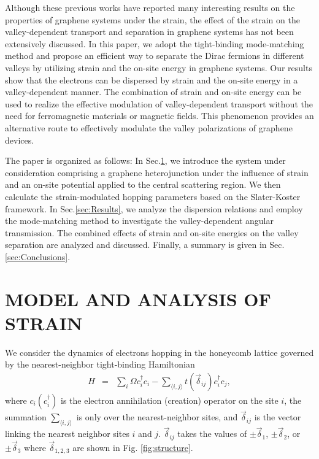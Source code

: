 \documentclass[reprint,amsmath,amssymb,aps,superscriptaddress]{revtex4-2}
\begin{document}
Although these previous works have reported many interesting results on the properties of graphene systems under the strain, the effect of the strain on the valley-dependent transport and separation in graphene systems has not been extensively discussed. In this paper, we adopt the tight-binding mode-matching method and propose an efficient way to separate the Dirac fermions in different valleys by utilizing strain and the on-site energy in graphene systems. Our results show that the electrons can be dispersed by strain and the on-site energy in a valley-dependent manner. The combination of strain and on-site energy can be used to realize the effective modulation of valley-dependent transport without the need for ferromagnetic materials or magnetic fields. This phenomenon provides an alternative route to effectively modulate the valley polarizations of graphene devices.

The paper is organized as follows: In Sec.\ref{sec:Model}, we introduce the system under consideration comprising a graphene heterojunction under the influence of strain and an on-site potential applied to the central scattering region. We then calculate the strain-modulated hopping parameters based on the Slater-Koster framework. In Sec.\ref{sec:Results}, we analyze the dispersion relations and employ the mode-matching method to investigate the valley-dependent angular transmission. The combined effects of strain and on-site energies on the valley separation are analyzed and discussed. Finally, a summary is given in Sec.\ref{sec:Conclusions}.

\section{MODEL AND ANALYSIS OF STRAIN}\label{sec:Model}
We consider the dynamics of electrons hopping in the honeycomb lattice governed by the nearest-neighbor tight-binding Hamiltonian~\cite{Song2012,Bahamon2011}
\begin{eqnarray}\label{eq:parameter}
	H&=&\sum_{i}\Omega c^\dag_{i} c_{i}- \sum_{\langle
		i,j\rangle} t(\vec{\delta}_{ij})c^\dag_{i}c_{j},
\end{eqnarray}
where $c_{i}(c^\dag_{i})$ is the electron annihilation (creation) operator on the site $i$, the summation $\sum_{\langle i,j\rangle} $ is only over the nearest-neighbor sites, and $\vec{\delta}_{ij}$ is the vector linking the nearest neighbor sites $i$ and $j$. $\vec{\delta}_{ij}$ takes the values of $\pm\vec{\delta}_1$, $\pm\vec{\delta}_2$, or $\pm\vec{\delta}_3$ where $\vec{\delta}_{1,2,3}$ are shown in Fig. \ref{fig:structure}.
\end{document}
